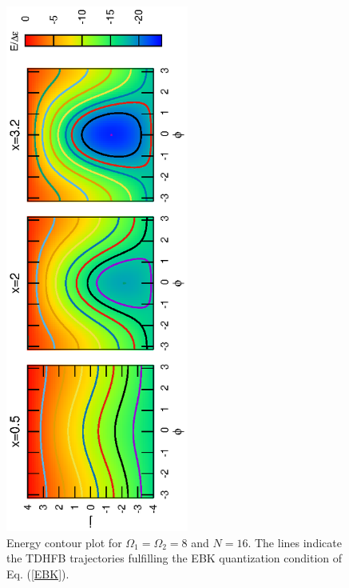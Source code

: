 \documentclass[11pt]{book} %
\begin{document}
\begin{figure}[tp]
 \begin{center}
  \includegraphics[width=60mm,angle=-90]{images/phase.eps}
 \end{center}
 \caption{Energy contour plot for $\Omega_1=\Omega_2=8$ and $N=16$.
	The lines indicate the TDHFB trajectories fulfilling
	the EBK quantization condition of Eq. (\ref{EBK}).
	}
 \label{fig:phase_space}
\end{figure}
\end{document}
